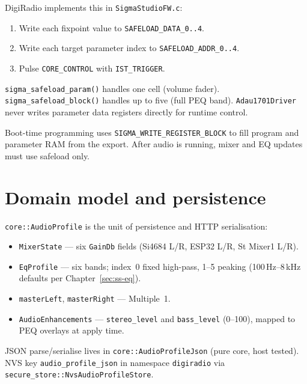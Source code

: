 DigiRadio implements this in \texttt{SigmaStudioFW.c}:

\begin{enumerate}
  \item Write each fixpoint value to \texttt{SAFELOAD\_DATA\_0..4}.
  \item Write each target parameter index to \texttt{SAFELOAD\_ADDR\_0..4}.
  \item Pulse \texttt{CORE\_CONTROL} with \texttt{IST\_TRIGGER}.
\end{enumerate}

\texttt{sigma\_safeload\_param()} handles one cell (volume fader).
\texttt{sigma\_safeload\_block()} handles up to five (full PEQ band).
\texttt{Adau1701Driver} never writes parameter data registers directly for
runtime control.

\begin{drcaution}
Boot-time programming uses \texttt{SIGMA\_WRITE\_REGISTER\_BLOCK} to fill
program and parameter RAM from the export. After audio is running, mixer and
EQ updates must use safeload only.
\end{drcaution}

\section{Domain model and persistence}
\label{sec:adau1701-domain}

\texttt{core::AudioProfile} is the unit of persistence and HTTP serialisation:

\begin{itemize}
  \item \texttt{MixerState} --- six \texttt{GainDb} fields (Si4684 L/R,
        ESP32 L/R, St Mixer1 L/R).
  \item \texttt{EqProfile} --- six bands; index~0 fixed high-pass, 1--5
        peaking (100\,Hz--8\,kHz defaults per Chapter~\ref{sec:ss-eq}).
  \item \texttt{masterLeft}, \texttt{masterRight} --- Multiple~1.
  \item \texttt{AudioEnhancements} --- \texttt{stereo\_level} and
        \texttt{bass\_level} (0--100), mapped to PEQ overlays at apply time.
\end{itemize}

JSON parse/serialise lives in \texttt{core::AudioProfileJson} (pure core, host
tested). NVS key \texttt{audio\_profile\_json} in namespace \texttt{digiradio}
via \texttt{secure\_store::NvsAudioProfileStore}.

